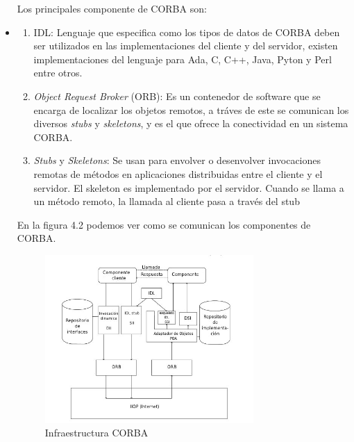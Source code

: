 \documentclass[12pt,a4paper,spanish,openany]{book}
\begin{document}
\begin{itemize}
Los principales componente de CORBA son:
\item
\begin{enumerate}
  \item IDL: Lenguaje que especifica como los tipos de datos de CORBA deben
  ser utilizados en las implementaciones del cliente y del servidor, existen
  implementaciones del lenguaje para Ada, C, C++, Java, Pyton y Perl entre
  otros.
  
  
  \item \emph{Object Request Broker} (ORB): Es un contenedor de software que se
  encarga de localizar los objetos remotos, a tráves de este se comunican los
  diversos \emph{stubs} y \emph{skeletons}, y es el que ofrece la conectividad
  en un sistema CORBA.
  
  
  \item \emph{Stubs} y \emph{Skeletons}: Se usan para envolver o desenvolver
  invocaciones remotas de métodos en aplicaciones distribuidas  entre
  el cliente y el servidor. El skeleton es implementado por el servidor. Cuando
  se llama a un método remoto, la llamada al cliente pasa a través del stub
  
\end{enumerate}
En la figura 4.2 podemos ver como se comunican los componentes de CORBA.


\begin{figure}
\begin{center}
\includegraphics[width=0.75\textwidth]{./img/corba.jpg}
\caption{Infraestructura CORBA}
\end{center}
\end{figure}



\end{itemize}
\end{document}
